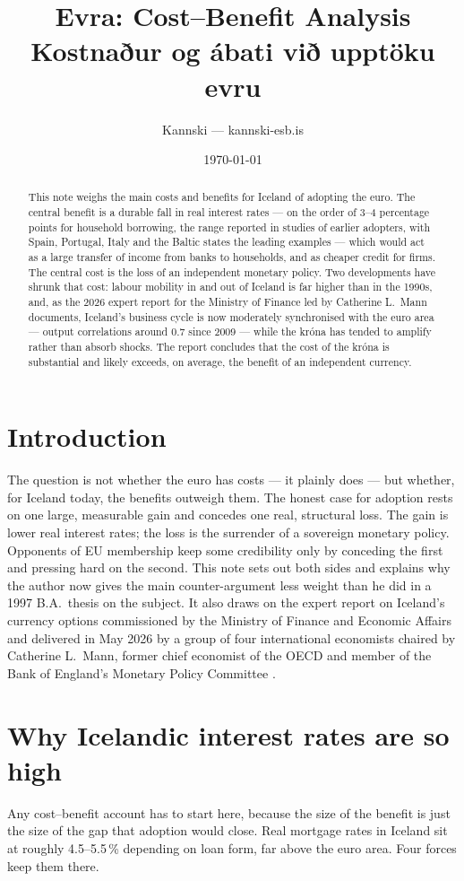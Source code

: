 \documentclass[11pt,a4paper]{article}
\title{Evra: Cost--Benefit Analysis \\ \large Kostnaður og ábati við upptöku evru}
\author{Kannski --- kannski-esb.is}
\date{\today}
\begin{document}
\maketitle

\begin{abstract}
This note weighs the main costs and benefits for Iceland of adopting the euro.
The central benefit is a durable fall in real interest rates --- on the order
of 3--4 percentage points for household borrowing, the range reported in
studies of earlier adopters, with Spain, Portugal, Italy and the Baltic states
the leading examples --- which would act as a large transfer of income from
banks to households, and as cheaper credit for firms. The central cost is the
loss of an independent monetary policy. Two developments have shrunk that
cost: labour mobility in and out of Iceland is far higher than in the 1990s,
and, as the 2026 expert report for the Ministry of Finance led by Catherine
L.~Mann documents, Iceland's business cycle is now moderately synchronised
with the euro area --- output correlations around 0.7 since 2009 --- while the
kr\'ona has tended to amplify rather than absorb shocks. The report concludes
that the cost of the kr\'ona is substantial and likely exceeds, on average,
the benefit of an independent currency.
\end{abstract}

\section{Introduction}
The question is not whether the euro has costs --- it plainly does --- but
whether, for Iceland today, the benefits outweigh them. The honest case for
adoption rests on one large, measurable gain and concedes one real, structural
loss. The gain is lower real interest rates; the loss is the surrender of a
sovereign monetary policy. Opponents of EU membership keep some credibility
only by conceding the first and pressing hard on the second. This note sets
out both sides and explains why the author now gives the main counter-argument
less weight than he did in a 1997 B.A.\ thesis on the subject. It also draws
on the expert report on Iceland's currency options commissioned by the
Ministry of Finance and Economic Affairs and delivered in May 2026 by a group
of four international economists chaired by Catherine L.~Mann, former chief
economist of the OECD and member of the Bank of England's Monetary Policy
Committee \citep[see][]{mann2026}.

\section{Why Icelandic interest rates are so high}
Any cost--benefit account has to start here, because the size of the benefit is
just the size of the gap that adoption would close. Real mortgage rates in
Iceland sit at roughly 4.5--5.5\,\% depending on loan form, far above the euro
area. Four forces keep them there.
\end{document}
